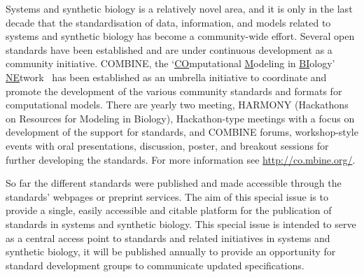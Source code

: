\documentclass{jib}
\begin{document}
Systems and synthetic biology is a relatively novel area, and it is only in the last decade that the standardisation of data, information, and models related to systems and synthetic biology has  become a community-wide effort. 
Several open standards have been established and are under continuous development as a community initiative. 
COMBINE, the `\underline{CO}mputational \underline{M}odeling in \underline{BI}ology' \underline{NE}twork~\cite{hucka2015promoting} has been established as an umbrella  initiative to coordinate and promote the development of the various community standards and formats for computational models. 
There are yearly two meeting, HARMONY (Hackathons on Resources for Modeling in Biology), Hackathon-type meetings with a focus on development of the support for standards, and COMBINE forums, workshop-style events with oral presentations, discussion, poster, and breakout sessions for  further developing the standards. 
For more information see \url{http://co.mbine.org/}. 

So far the different standards were published and made accessible through the standards' webpages or preprint services. 
The aim of this special issue is to provide a single, easily accessible and citable platform for the publication of standards in systems and synthetic biology. 
This special issue is intended to serve as a central access point to standards and related initiatives in systems and synthetic biology, it will be published annually to provide an opportunity for standard development groups to communicate updated specifications.
\end{document}
